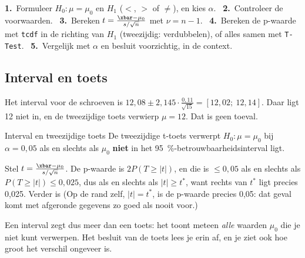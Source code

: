 \begin{werkwijze}
\textbf{1.}~Formuleer $H_0\colon \mu = \mu_0$ en $H_1$ ($<$, $>$ of $\neq$), en kies $\alpha$. \ \textbf{2.}~Controleer de voorwaarden. \ \textbf{3.}~Bereken $t = \frac{\xbar - \mu_0}{s/\sqrt n}$ met $\nu = n - 1$. \ \textbf{4.}~Bereken de p-waarde met \texttt{tcdf} in de richting van $H_1$ (tweezijdig: verdubbelen), of alles samen met \texttt{T-Test}. \ \textbf{5.}~Vergelijk met $\alpha$ en besluit voorzichtig, in de context.
\end{werkwijze}

\begin{oefeningen}

\end{oefeningen}

\subsection{Interval en toets}

Het interval voor de schroeven is $12{,}08 \pm 2{,}145 \cdot \frac{0{,}11}{\sqrt{15}} = [12{,}02;\ 12{,}14]$. Daar ligt 12 niet in, en de tweezijdige toets verwierp $\mu = 12$. Dat is geen toeval.

\begin{theorie}
\begin{stelling}{Interval en tweezijdige toets}
De tweezijdige t-toets verwerpt $H_0\colon \mu = \mu_0$ bij $\alpha = 0{,}05$ als en slechts als $\mu_0$ \textbf{niet} in het 95~\%-betrouwbaarheidsinterval ligt.
\end{stelling}

\begin{bewijs}
Stel $t = \frac{\xbar - \mu_0}{s/\sqrt n}$. De p-waarde is $2P(T \geqslant |t|)$, en die is $\leqslant 0{,}05$ als en slechts als $P(T \geqslant |t|) \leqslant 0{,}025$, dus als en slechts als $|t| \geqslant t^*$, want rechts van $t^*$ ligt precies 0,025. Verder is
\bewijsregel{|t| \geqslant t^* \iff |\xbar - \mu_0| \geqslant t^* \frac{s}{\sqrt n} = E \iff \mu_0 \notin\ ]\xbar - E,\ \xbar + E[ .}
(Op de rand zelf, $|t| = t^*$, is de p-waarde precies 0,05: dat geval komt met afgeronde gegevens zo goed als nooit voor.)
\end{bewijs}
\end{theorie}

Een interval zegt dus meer dan een toets: het toont meteen \textit{alle} waarden $\mu_0$ die je niet kunt verwerpen. Het besluit van de toets lees je erin af, en je ziet ook hoe groot het verschil ongeveer is.

